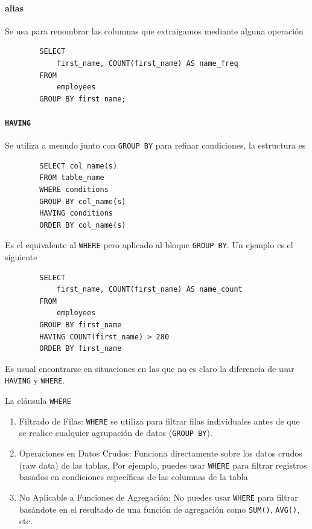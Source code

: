         \paragraph{alias} Se usa para renombrar las columnas que extraigamos mediante alguna operación
        \begin{verbatim}
        SELECT
            first_name, COUNT(first_name) AS name_freq
        FROM
            employees
        GROUP BY first name;
        \end{verbatim}
        \paragraph{\texttt{HAVING}} Se utiliza a menudo junto con \texttt{GROUP BY} para refinar condiciones, la estructura es 
        \begin{verbatim}
        SELECT col_name(s)
        FROM table_name
        WHERE conditions
        GROUP BY col_name(s)
        HAVING conditions
        ORDER BY col_name(s)
        \end{verbatim}
        Es el equivalente al \texttt{WHERE} pero aplicado al bloque \texttt{GROUP BY}.  Un ejemplo es el siguiente

        \begin{verbatim}
        SELECT 
            first_name, COUNT(first_name) AS name_count
        FROM
            employees
        GROUP BY first_name
        HAVING COUNT(first_name) > 280
        ORDER BY first_name
        \end{verbatim}

        Es usual encontrarse en situaciones en las que no es claro la diferencia de usar \texttt{HAVING} y \texttt{WHERE}.

        La cláusula \texttt{WHERE}
        \begin{enumerate}
            \item Filtrado de Filas: \verb|WHERE| se utiliza para filtrar filas individuales antes de que se realice cualquier agrupación de datos (\verb|GROUP BY|).
            \item Operaciones en Datos Crudos: Funciona directamente sobre los datos crudos (raw data) de las tablas. Por ejemplo, puedes usar \verb|WHERE| para filtrar registros basados en condiciones específicas de las columnas de la tabla
            \item No Aplicable a Funciones de Agregación: No puedes usar \verb|WHERE| para filtrar basándote en el resultado de una función de agregación como \verb|SUM()|, \verb|AVG()|, etc.
        \end{enumerate}

